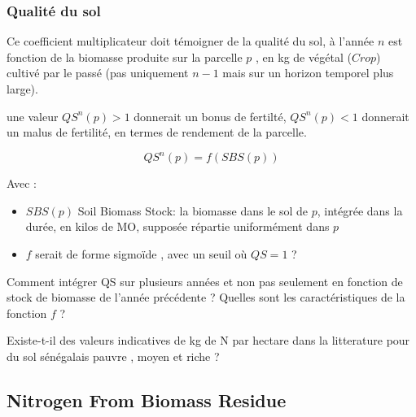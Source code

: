 \documentclass[10pt,a4paper,french]{article} %
\begin{document}
\subsubsection{Qualité du sol}

Ce coefficient multiplicateur doit témoigner de la qualité du sol, à l'année $n$ est fonction de la biomasse produite sur la parcelle $p$ , en kg de végétal ($Crop$) cultivé par le passé (pas uniquement $n-1$ mais sur un horizon temporel plus large).

une valeur $QS^n(p)>1$ donnerait un bonus de fertilté, $QS^n(p)<1$ donnerait un malus de fertilité, en termes de rendement de la parcelle.



\begin{equation}
QS^{n}(p) = f(SBS(p))
\end{equation}

Avec  :


\begin{itemize}
  \item  $SBS(p)$ Soil Biomass Stock: la biomasse dans le sol de $p$, intégrée dans la durée, en kilos de MO, supposée répartie uniformément dans $p$
  \item $f$ serait de forme sigmoïde , avec un seuil où $QS=1$ ? 
\end{itemize}




\begin{tcolorbox}[noparskip,
    colback=LimeGreen,colframe=Green,%
    colbacklower=LimeGreen!75!LightGreen,%
    title=Changement]
Comment intégrer QS sur plusieurs années et non pas seulement en fonction de stock de biomasse de l'année précédente ? 
Quelles sont les caractéristiques de la fonction $f$ ? 
\end{tcolorbox}







\begin{tcolorbox}[noparskip,
    colback=LimeGreen,colframe=Green,%
    colbacklower=LimeGreen!75!LightGreen,%
    title=Changement]
Existe-t-il des valeurs indicatives de kg de N par hectare dans la litterature pour du sol sénégalais pauvre , moyen  et  riche  ? 
\end{tcolorbox}








\subsection{Nitrogen From Biomass Residue}
\end{document}
